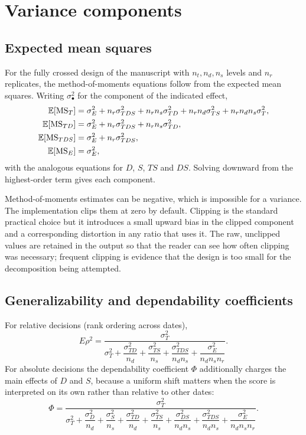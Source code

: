 \documentclass[12pt,a4paper,oneside]{article}
\begin{document}
\section{Variance components}

\subsection{Expected mean squares}

For the fully crossed design of the manuscript with $n_t,n_d,n_s$ levels and
$n_r$ replicates, the method-of-moments equations follow from the expected mean
squares. Writing $\sigma^2_{\bullet}$ for the component of the indicated effect,
\begin{align}
\mathbb{E}[\mathrm{MS}_T] &= \sigma^2_E + n_r\sigma^2_{TDS} + n_rn_s\sigma^2_{TD}
+ n_rn_d\sigma^2_{TS} + n_rn_dn_s\sigma^2_T,\\
\mathbb{E}[\mathrm{MS}_{TD}] &= \sigma^2_E + n_r\sigma^2_{TDS} + n_rn_s\sigma^2_{TD},\\
\mathbb{E}[\mathrm{MS}_{TDS}] &= \sigma^2_E + n_r\sigma^2_{TDS},\\
\mathbb{E}[\mathrm{MS}_E] &= \sigma^2_E,
\end{align}
with the analogous equations for $D$, $S$, $TS$ and $DS$. Solving downward from
the highest-order term gives each component.

\begin{remark}
Method-of-moments estimates can be negative, which is impossible for a variance.
The implementation clips them at zero by default. Clipping is the standard
practical choice but it introduces a small upward bias in the clipped component
and a corresponding distortion in any ratio that uses it. The raw, unclipped
values are retained in the output so that the reader can see how often clipping
was necessary; frequent clipping is evidence that the design is too small for
the decomposition being attempted.
\end{remark}

\subsection{Generalizability and dependability coefficients}

For relative decisions (rank ordering across dates),
\begin{equation}
E\rho^2=\frac{\sigma^2_T}
{\sigma^2_T+\dfrac{\sigma^2_{TD}}{n_d}+\dfrac{\sigma^2_{TS}}{n_s}
+\dfrac{\sigma^2_{TDS}}{n_dn_s}+\dfrac{\sigma^2_E}{n_dn_s n_r}} .
\label{eq:erho-en}
\end{equation}
For absolute decisions the dependability coefficient $\Phi$ additionally charges
the main effects of $D$ and $S$, because a uniform shift matters when the score
is interpreted on its own rather than relative to other dates:
\begin{equation}
\Phi=\frac{\sigma^2_T}
{\sigma^2_T+\dfrac{\sigma^2_D}{n_d}+\dfrac{\sigma^2_S}{n_s}
+\dfrac{\sigma^2_{TD}}{n_d}+\dfrac{\sigma^2_{TS}}{n_s}
+\dfrac{\sigma^2_{DS}}{n_dn_s}
+\dfrac{\sigma^2_{TDS}}{n_dn_s}+\dfrac{\sigma^2_E}{n_dn_sn_r}} .
\label{eq:phi-en}
\end{equation}
\end{document}
